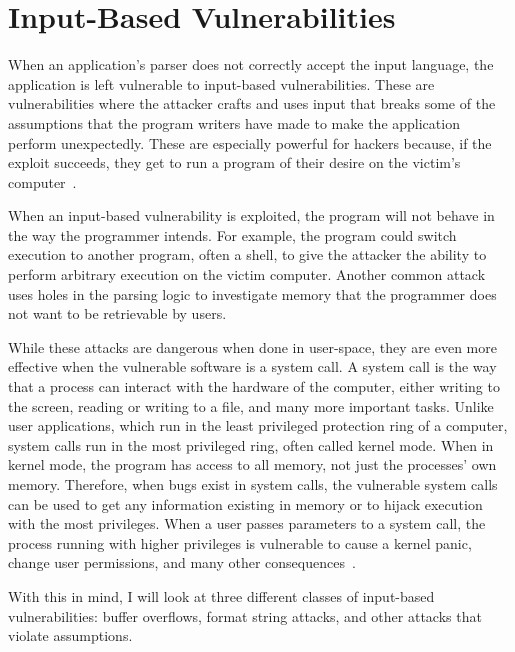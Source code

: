 \section{Input-Based Vulnerabilities}
\label{sec:inputBasedVulnerabilities}
When an application's parser does not correctly accept the input language, the application is left vulnerable to input-based vulnerabilities.  These are vulnerabilities where the attacker crafts and uses input that breaks some of the assumptions that the program writers have made to make the application perform unexpectedly.  These are especially powerful for hackers because, if the exploit succeeds, they get to run a program of their desire on the victim's computer~\cite{sassaman2011halting}.

When an input-based vulnerability is exploited, the program will not behave in the way the programmer intends.  For example, the program could switch execution to another program, often a shell, to give the attacker the ability to perform arbitrary execution on the victim computer.  Another common attack uses holes in the parsing logic to investigate memory that the programmer does not want to be retrievable by users.

While these attacks are dangerous when done in user-space, they are even more effective when the vulnerable software is a system call.  A system call is the way that a process can interact with the hardware of the computer, either writing to the screen, reading or writing to a file, and many more important tasks.  Unlike user applications, which run in the least privileged protection ring of a computer, system calls run in the most privileged ring, often called kernel mode.  When in kernel mode, the program has access to all memory, not just the processes' own memory.  Therefore, when bugs exist in system calls, the vulnerable system calls can be used to get any information existing in memory or to hijack execution with the most privileges.  When a user passes parameters to a system call, the process running with higher privileges is vulnerable to cause a kernel panic, change user permissions, and many other consequences~\cite{johnson2004finding}.

With this in mind, I will look at three different classes of input-based vulnerabilities: buffer overflows, format string attacks, and other attacks that violate assumptions.

